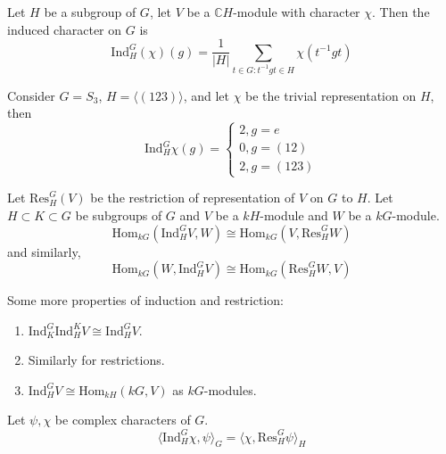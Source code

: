 \documentclass[openany]{book}
\newcommand{\C}{\mathbb{C}}
\newcommand{\la}{\langle}
\newcommand{\ra}{\rangle}
\begin{document}
\begin{defn}
    Let $H$ be a subgroup of $G$, let $V$ be a $\C H$-module with character $\chi$. Then the induced character on $G$ is 
    \begin{equation*}
        \text{Ind}_H^G(\chi)(g)=\frac{1}{|H|}\sum_{t\in G: t^{-1}gt\in H}\chi(t^{-1}gt)
    \end{equation*}
\end{defn}

\begin{example}
    Consider $G=S_3$, $H=\la(123)\ra$, and let $\chi$ be the trivial representation on $H$, then 
    \begin{equation*}
        \text{Ind}_H^G\chi(g)=\begin{cases}
            2, g=e\\
            0, g=(12)\\
            2, g=(123)
        \end{cases}
    \end{equation*}
\end{example}

\begin{prop}
    Let $\text{Res}_H^G(V)$ be the restriction of representation of $V$ on $G$ to $H$. Let $H\subset K\subset G$ be subgroups of $G$ and $V$ be a $kH$-module and $W$ be a $kG$-module. 
    \begin{equation*}
        \text{Hom}_{kG}(\text{Ind}_H^GV,W)\cong\text{Hom}_{kG}(V,\text{Res}_H^GW)
    \end{equation*}
    and similarly, 
    \begin{equation*}
        \text{Hom}_{kG}(W,\text{Ind}_H^GV)\cong\text{Hom}_{kG}(\text{Res}_H^GW,V)
    \end{equation*}
\end{prop}

\begin{prop}
    Some more properties of induction and restriction:
    \begin{enumerate}
        \item $\text{Ind}_K^G\text{Ind}_H^KV\cong\text{Ind}_H^GV$.
        \item Similarly for restrictions.
        \item $\text{Ind}_H^GV\cong\text{Hom}_{kH}(kG, V)$ as $kG$-modules.
    \end{enumerate}
\end{prop}

\begin{prop}
    Let $\psi,\chi$ be complex characters of $G$.
    \begin{equation*}
        \la\text{Ind}_H^G\chi, \psi\ra_G=\la \chi,\text{Res}_H^G\psi\ra_H
    \end{equation*}
\end{prop}
\end{document}
